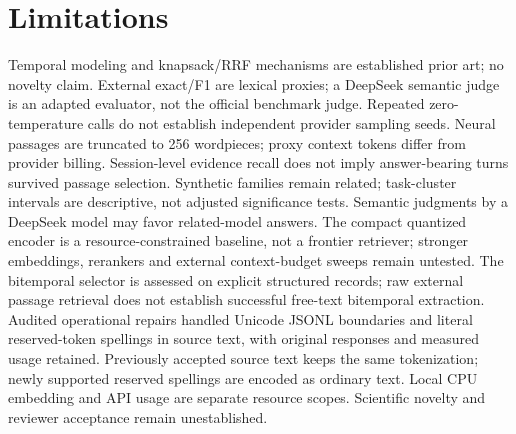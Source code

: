\documentclass{article}
\begin{document}
\section{Limitations}
Temporal modeling and knapsack/RRF mechanisms are established prior art; no novelty claim. External exact/F1 are lexical proxies; a DeepSeek semantic judge is an adapted evaluator, not the official benchmark judge. Repeated zero-temperature calls do not establish independent provider sampling seeds. Neural passages are truncated to 256 wordpieces; proxy context tokens differ from provider billing. Session-level evidence recall does not imply answer-bearing turns survived passage selection. Synthetic families remain related; task-cluster intervals are descriptive, not adjusted significance tests. Semantic judgments by a DeepSeek model may favor related-model answers. The compact quantized encoder is a resource-constrained baseline, not a frontier retriever; stronger embeddings, rerankers and external context-budget sweeps remain untested. The bitemporal selector is assessed on explicit structured records; raw external passage retrieval does not establish successful free-text bitemporal extraction. Audited operational repairs handled Unicode JSONL boundaries and literal reserved-token spellings in source text, with original responses and measured usage retained. Previously accepted source text keeps the same tokenization; newly supported reserved spellings are encoded as ordinary text. Local CPU embedding and API usage are separate resource scopes. Scientific novelty and reviewer acceptance remain unestablished.
\end{document}
